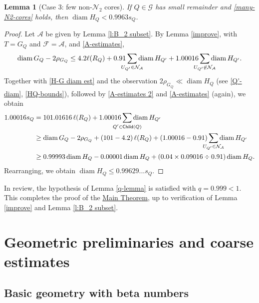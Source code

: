 \documentclass[12pt]{amsart}
\numberwithin{equation}{section}
\theoremstyle{plain}
\newtheorem{lemma}[theorem]{Lemma}
\theoremstyle{definition}
\newcommand{\diam}{\mathop\mathrm{diam}\nolimits}
\newcommand{\Child}{\mathop\mathsf{Child}\nolimits}
\numberwithin{figure}{section}
\begin{document}
\begin{lemma}[Case 3: few non-$\mathcal{N}_2$ cores]\label{case3} If $Q\in\mathscr{G}$ has small remainder and \eqref{many-N2-cores} holds, then $\diam H_Q < 0.9963s_Q$.
\end{lemma}

\begin{proof} Let $\mathcal{A}$ be given by Lemma \ref{l:B_2 subset}. By Lemma \ref{improve}, with $T=G_Q$ and $\mathcal{F}=\mathcal{A}$, and \eqref{A-estimates}, $$\diam G_Q-2\rho_{G_Q}\leq 4.2\ell(R_Q) + 0.91\sum_{\mathclap{U_{Q'}\in\mathcal{N}_\mathcal{A}}} \diam H_{Q'} + 1.00016 \sum_{\mathclap{U_{Q'}\not\in \mathcal{N}_\mathcal{A}}}\diam H_{Q'}.$$ Together with \eqref{H-G diam est} and the observation $2\rho_{G_Q}\ll \diam H_Q$ (see \eqref{Q'-diam}, \eqref{HQ-bounds}), followed by \eqref{A-estimates 2} and \eqref{A-estimates} (again), we obtain \begin{align*}
 1.00016s_Q &= 101.01616\,\ell(R_Q)+ 1.00016\sum_{\mathclap{Q'\in\Child(Q)}} \diam H_{Q'}\\
 &\geq \diam G_Q - 2\rho_{G_Q} + (101-4.2)\,\ell(R_Q)+(1.00016-0.91)\sum_{\mathclap{U_{Q'}\in\mathcal{N}_\mathcal{A}}} \diam H_{Q'}\\
&\geq 0.99993\diam H_Q-0.00001\diam H_Q+(0.04\times 0.09016\div 0.91)\diam H_Q.\end{align*} Rearranging, we obtain $\diam H_Q \leq 0.99629... s_Q$.\end{proof}

In review, the hypothesis of Lemma \ref{q-lemma} is satisfied with $q=0.999<1$. This completes the proof of the \hyperref[t:main]{Main Theorem}, up to verification of Lemma \ref{improve} and Lemma \ref{l:B_2 subset}.

\section{Geometric preliminaries and coarse estimates}\label{sec:prelim}

\subsection{Basic geometry with beta numbers}\label{ss:basic}
\end{document}
